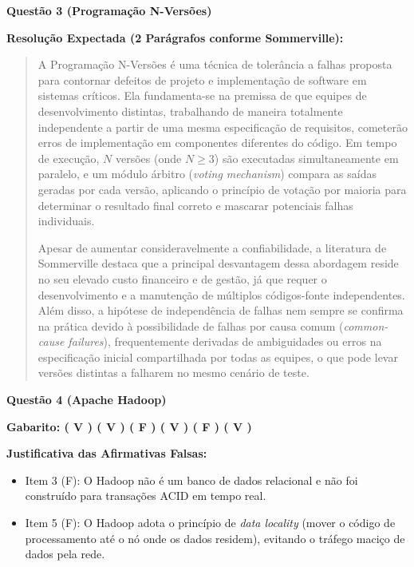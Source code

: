 \documentclass[12pt,a4paper]{article}
\begin{document}
\vspace{0.5cm}

\textbf{Questão 3 (Programação N-Versões)}

\textbf{Resolução Expectada (2 Parágrafos conforme Sommerville):}
\begin{quote}
A Programação N-Versões é uma técnica de tolerância a falhas proposta para contornar defeitos de projeto e implementação de software em sistemas críticos. Ela fundamenta-se na premissa de que equipes de desenvolvimento distintas, trabalhando de maneira totalmente independente a partir de uma mesma especificação de requisitos, cometerão erros de implementação em componentes diferentes do código. Em tempo de execução, $N$ versões (onde $N \ge 3$) são executadas simultaneamente em paralelo, e um módulo árbitro (\textit{voting mechanism}) compara as saídas geradas por cada versão, aplicando o princípio de votação por maioria para determinar o resultado final correto e mascarar potenciais falhas individuais.

Apesar de aumentar consideravelmente a confiabilidade, a literatura de Sommerville destaca que a principal desvantagem dessa abordagem reside no seu elevado custo financeiro e de gestão, já que requer o desenvolvimento e a manutenção de múltiplos códigos-fonte independentes. Além disso, a hipótese de independência de falhas nem sempre se confirma na prática devido à possibilidade de falhas por causa comum (\textit{common-cause failures}), frequentemente derivadas de ambiguidades ou erros na especificação inicial compartilhada por todas as equipes, o que pode levar versões distintas a falharem no mesmo cenário de teste.
\end{quote}

\vspace{0.5cm}

\textbf{Questão 4 (Apache Hadoop)}

\textbf{Gabarito: ( V ) ( V ) ( F ) ( V ) ( F ) ( V )}

\textbf{Justificativa das Afirmativas Falsas:}
\begin{itemize}
    \item Item 3 (F): O Hadoop não é um banco de dados relacional e não foi construído para transações ACID em tempo real.
    \item Item 5 (F): O Hadoop adota o princípio de \textit{data locality} (mover o código de processamento até o nó onde os dados residem), evitando o tráfego maciço de dados pela rede.
\end{itemize}
\end{document}
